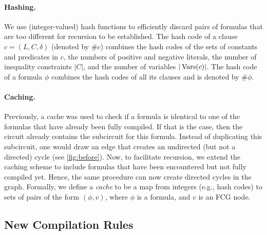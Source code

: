 
\paragraph{Hashing.}
We use (integer-valued) hash functions to efficiently discard pairs of formulas that are too different for recursion to be established. The hash code of a clause $c = (L, C, \delta)$ (denoted by $\# c$) combines the hash codes of the sets of constants and predicates in $c$, the numbers of positive and negative literals, the number of inequality constraints $|C|$, and the number of variables $|\operatorname{Vars}(c)|$. The hash code of a formula $\phi$ combines the hash codes of all its clauses and is denoted by $\#\phi$.

\paragraph{Caching.}
Previously, a cache was used to check if a formula is identical to one of the formulas that have already been fully compiled. If that is the case, then the circuit already contains the subcircuit for this formula. Instead of duplicating this subcircuit, one would draw an edge that creates an undirected (but not a directed) cycle (see \cref{fig:before}). Now, to facilitate recursion, we extend the caching scheme to include formulas that have been encountered but not fully compiled yet. Hence, the same procedure can now create directed cycles in the graph. Formally, we define a \emph{cache} to be a map from integers (e.g., hash codes) to sets of pairs of the form $(\phi, v)$, where $\phi$ is a formula, and $v$ is an FCG node.


\subsection{New Compilation Rules} \label{sec:rules}

